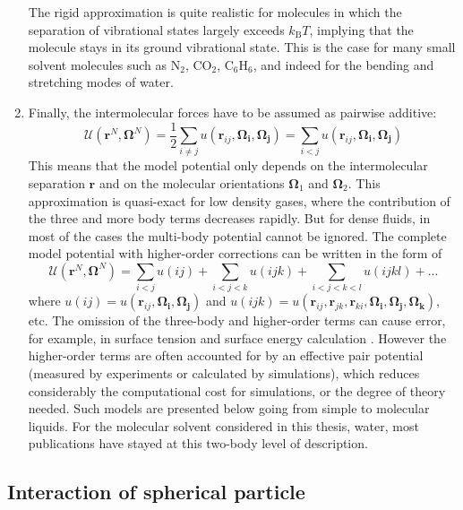 \begin{enumerate}
The rigid approximation is quite realistic for molecules in which
the separation of vibrational states largely exceeds $k_{\mathrm{B}}T$,
implying that the molecule stays in its ground vibrational state.
This is the case for many small solvent molecules such as $\mathrm{N_{2}}$,
$\mathrm{CO_{2}}$, $\mathrm{C_{6}H_{6}}$, and indeed for the bending
and stretching modes of water. 
\item Finally, the intermolecular forces have to be assumed as pairwise
additive:
\begin{equation}
\mathcal{U}(\mathbf{r}^{N},\mathbf{\Omega}^{N})=\frac{1}{2}\sum_{i\neq j}u(\mathbf{r}_{ij},\mathbf{\Omega_{i}},\mathbf{\Omega_{j}})=\sum_{i<j}u(\mathbf{r}_{ij},\mathbf{\Omega_{i}},\mathbf{\Omega_{j}})\label{eq:pair-potential}
\end{equation}
This means that the model potential only depends on the intermolecular
separation $\mathbf{r}$ and on the molecular orientations $\mathbf{\Omega}_{1}$
and $\mathbf{\Omega}_{2}$. This approximation is quasi-exact for
low density gases, where the contribution of the three and more body
terms decreases rapidly. But for dense fluids, in most of the cases
the multi-body potential cannot be ignored. The complete model potential
with higher-order corrections can be written in the form of
\begin{equation}
\mathcal{U}(\mathbf{r}^{N},\mathbf{\Omega}^{N})=\sum_{i<j}u(ij)+\sum_{i<j<k}u(ijk)+\sum_{i<j<k<l}u(ijkl)+...
\end{equation}
where $u(ij)=u(\mathbf{r}_{ij},\mathbf{\Omega_{i}},\mathbf{\Omega_{j}})$
and $u(ijk)=u(\mathbf{r}_{ij},\mathbf{r}_{jk},\mathbf{r}_{ki},\mathbf{\Omega_{i}},\mathbf{\Omega_{j}},\mathbf{\Omega_{k}})$,
etc. The omission of the three-body and higher-order terms can cause
error, for example, in surface tension and surface energy calculation
\citep{Miyazaki_1975}. However the higher-order terms are often accounted
for by an effective pair potential (measured by experiments or calculated
by simulations), which reduces considerably the computational cost
for simulations, or the degree of theory needed. Such models are presented
below going from simple to molecular liquids. For the molecular solvent
considered in this thesis, water, most publications have stayed at
this two-body level of description. 
\end{enumerate}

\subsection{Interaction of spherical particle}


